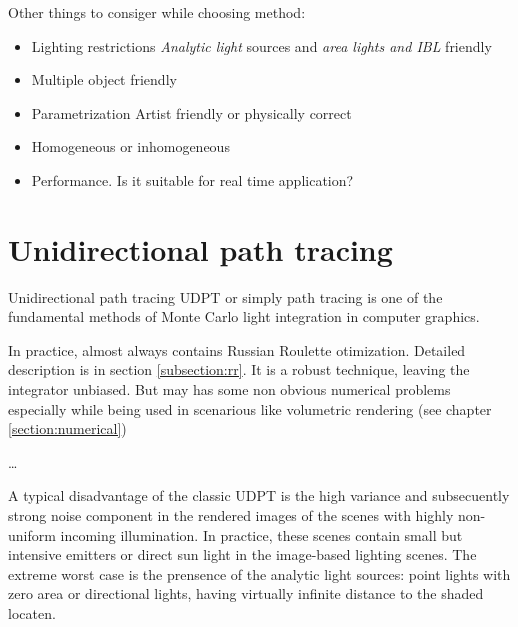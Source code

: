 Other things to consiger while choosing method:
\begin{itemize}
  \item Lighting restrictions \emph{Analytic light} sources and \emph{area lights and IBL} friendly
  \item Multiple object friendly
  \item Parametrization Artist friendly or physically correct
  \item Homogeneous or inhomogeneous
  \item Performance. Is it suitable for real time application?
\end{itemize}

\section{Unidirectional path tracing}
Unidirectional path tracing \gls{UDPT} or simply path tracing is one of the
fundamental methods of Monte Carlo light integration in computer graphics.

In practice, almost always contains Russian Roulette otimization. Detailed
description is in section \ref{subsection:rr}. It is a robust technique, leaving
the integrator unbiased. But may has some non obvious numerical problems
especially while being used in scenarious like volumetric rendering (see
chapter \ref{section:numerical})

\ldots

A typical disadvantage of the classic \gls{UDPT} is the high variance and
subsecuently strong noise component in the rendered images of the scenes with 
highly non-uniform incoming illumination.
In practice, these scenes contain small but intensive emitters or direct sun
light in the image-based lighting scenes. The extreme worst case is the
prensence of the analytic light sources: point lights with zero area or
directional lights, having virtually infinite distance to the shaded locaten.

